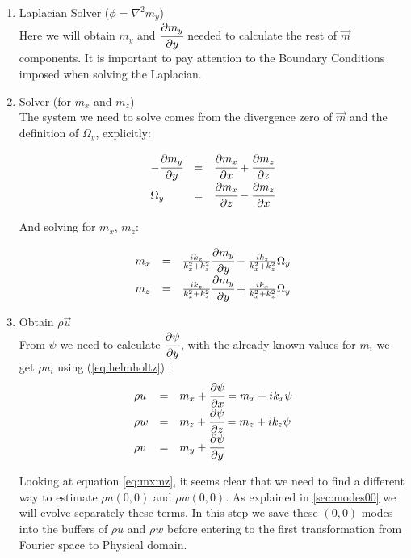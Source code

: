 \documentclass[titlepage,11pt]{article}
\newcommand\ppx[1]{\cfrac{\partial#1}{\partial x}} %
\newcommand\ppy[1]{\cfrac{\partial#1}{\partial y}} %
\newcommand\ppz[1]{\cfrac{\partial#1}{\partial z}} %
\begin{document}
\begin{enumerate}
	\item Laplacian Solver  ($\phi=\nabla^2 m_y$)\\
Here we will obtain $m_y$ and $\ppy{m_y}$ needed to calculate the rest of $\vec{m}$ components. It is important to pay attention to the Boundary Conditions imposed when solving the Laplacian.
	\item Solver (for $m_x$ and $m_z$) \\
The system we need to solve comes from the divergence zero of $\vec{m}$ and the definition of $\Omega_y$, explicitly:


\begin{equation}
	\begin{array}{lcl}
		-\ppy{m_y}&=&\ppx{m_x}+\ppz{m_z} \\
		\Omega_y &=&\ppz{m_x}-\ppx{m_z} 
	\end{array}
\end{equation}

And solving for $m_x$, $m_z$:

\begin{equation}
	\begin{array}{lcl}
		\displaystyle m_x&=&\frac{i k_x}{k_x^2+k_z^2}\ppy{m_y}-\frac{i k_z}{k_x^2+k_z^2}\Omega_y \\
		\displaystyle m_z&=&\frac{i k_z}{k_x^2+k_z^2}\ppy{m_y}+\frac{i k_x}{k_x^2+k_z^2}\Omega_y
		\label{eq:mxmz}
	\end{array}
\end{equation}

\item Obtain $\rho \vec{u}$\\
From $\psi$ we need to calculate $\ppy{\psi}$, with the already known values for $m_i$ we get $\rho u_i$ using (\ref{eq:helmholtz}) :
\begin{equation}
	\begin{array}{lcl}
		\rho u &=& m_x + \ppx{\psi} =m_x+i k_x \psi \\
		\rho w &=& m_z+ \ppz{\psi} =m_z+i k_z \psi \\
		\rho v &=& m_y + \ppy{\psi} 	
	\end{array}
\end{equation}

Looking at equation \ref{eq:mxmz}, it seems clear that we need to find a different way to estimate $\rho u (0,0)$ and $\rho w (0,0)$. As explained in \ref{sec:modes00} we will evolve separately these terms. In this step we save these $(0,0)$ modes into the buffers of $\rho u$ and $\rho w$ before entering to the first transformation from Fourier space to Physical domain.


\end{enumerate}
\end{document}
